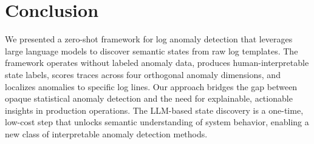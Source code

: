 \documentclass[11pt]{article}
\begin{document}
\section{Conclusion}
\label{sec:conclusion}

We presented a zero-shot framework for log anomaly detection that leverages large language models to discover semantic states from raw log templates. The framework operates without labeled anomaly data, produces human-interpretable state labels, scores traces across four orthogonal anomaly dimensions, and localizes anomalies to specific log lines. Our approach bridges the gap between opaque statistical anomaly detection and the need for explainable, actionable insights in production operations. The LLM-based state discovery is a one-time, low-cost step that unlocks semantic understanding of system behavior, enabling a new class of interpretable anomaly detection methods.
\end{document}
